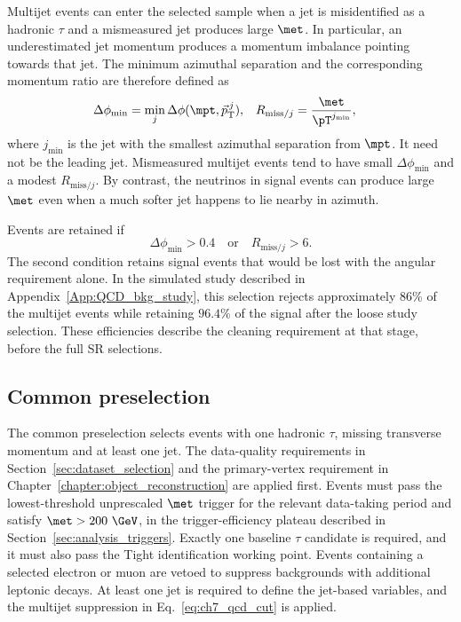 Multijet events can enter the selected sample when a jet is misidentified as a hadronic $\tau$ and a mismeasured jet produces large $\met$.
In particular, an underestimated jet momentum produces a momentum imbalance pointing towards that jet.
The minimum azimuthal separation and the corresponding momentum ratio are therefore defined as
\begin{align}
    \Delta\phi_{\min} &= \min_j\Delta\phi(\mpt,\vec p_{\mathrm{T}}^{\,j}),
    &R_{\mathrm{miss}/j} &= \frac{\met}{\pT^{j_{\min}}},
    \label{eq:ch7_qcd_variables}
\end{align}
where $j_{\min}$ is the jet with the smallest azimuthal separation from $\mpt$.
It need not be the leading jet.
Mismeasured multijet events tend to have small $\Delta\phi_{\min}$ and a modest $R_{\mathrm{miss}/j}$.
By contrast, the neutrinos in signal events can produce large $\met$ even when a much softer jet happens to lie nearby in azimuth.

Events are retained if
\begin{equation}
    \Delta\phi_{\min}>0.4
    \quad\text{or}\quad
    R_{\mathrm{miss}/j}>6.
    \label{eq:ch7_qcd_cut}
\end{equation}
The second condition retains signal events that would be lost with the angular requirement alone.
In the simulated study described in Appendix~\ref{App:QCD_bkg_study}, this selection rejects approximately $86\%$ of the multijet events while retaining $96.4\%$ of the signal after the loose study selection.
These efficiencies describe the cleaning requirement at that stage, before the full SR selections.

\subsection{Common preselection}
\label{subsec:ch7_common_preselection}

The common preselection selects events with one hadronic $\tau$, missing transverse momentum and at least one jet.
The data-quality requirements in Section~\ref{sec:dataset_selection} and the primary-vertex requirement in Chapter~\ref{chapter:object_reconstruction} are applied first.
Events must pass the lowest-threshold unprescaled $\met$ trigger for the relevant data-taking period and satisfy $\met>200~\GeV$, in the trigger-efficiency plateau described in Section~\ref{sec:analysis_triggers}.
Exactly one baseline $\tau$ candidate is required, and it must also pass the Tight identification working point.
Events containing a selected electron or muon are vetoed to suppress backgrounds with additional leptonic decays.
At least one jet is required to define the jet-based variables, and the multijet suppression in Eq.~\ref{eq:ch7_qcd_cut} is applied.

